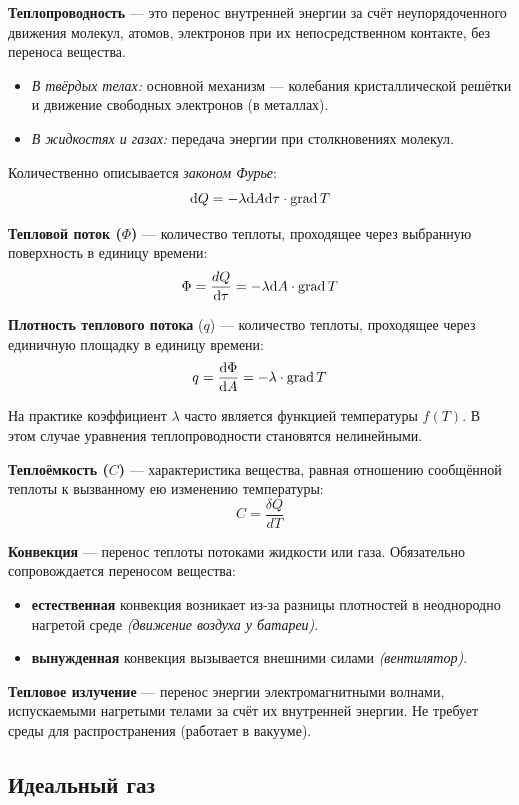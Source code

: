 \textbf{Теплопроводность} --- это перенос внутренней энергии за счёт неупорядоченного движения молекул, атомов, электронов при их непосредственном контакте, без переноса вещества.
\begin{itemize}
    \item \textit{В твёрдых телах:} основной механизм --- колебания кристаллической решётки и движение свободных электронов (в металлах).
    \item \textit{В жидкостях и газах:} передача энергии при столкновениях молекул.
\end{itemize}

Количественно описывается \textit{законом Фурье}:
\[
\mathrm{d} Q = -\lambda\mathrm{d} A\mathrm{d}\tau\cdot\textrm{grad}\, T
\]

\textbf{Тепловой поток ($\Phi$)} --- количество теплоты, проходящее через выбранную поверхность в единицу времени: 
\[
\Phi = \frac{dQ}{\mathrm{d}\tau}=-\lambda\mathrm{d} A\cdot\textrm{grad}\, T
\]

\textbf{Плотность теплового потока} ($q$) --- количество теплоты, проходящее через единичную площадку в единицу времени:
\[
q = \frac{\mathrm{d}\Phi}{\mathrm{d} A} = -\lambda\cdot\textrm{grad}\, T
\]

На практике коэффициент $\lambda$ часто является функцией температуры \( f(T) \). В этом случае уравнения теплопроводности становятся нелинейными.

\textbf{Теплоёмкость ($C$)} --- характеристика вещества, равная отношению сообщённой теплоты к вызванному ею изменению температуры: 
\[
C = \frac{\delta Q}{dT}
\]

\textbf{Конвекция} --- перенос теплоты потоками жидкости или газа. Обязательно сопровождается переносом вещества:

\begin{itemize}
    \item \textbf{естественная} конвекция возникает из-за разницы плотностей в неоднородно нагретой среде \textit{(движение воздуха у батареи)}.
    \item \textbf{вынужденная} конвекция вызывается внешними силами \textit{(вентилятор)}.
\end{itemize}

\textbf{Тепловое излучение} --- перенос энергии электромагнитными волнами, испускаемыми нагретыми телами за счёт их внутренней энергии. Не требует среды для распространения (работает в вакууме).

\subsection{Идеальный газ}

